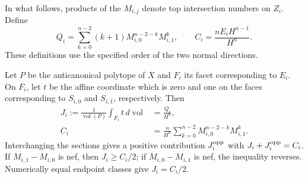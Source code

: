 In what follows, products of the $M_{i,j}$ denote top intersection
numbers on $Z_i$. Define
\begin{equation}\label{intrinsic:Q}
 Q_i=\sum_{k=0}^{n-2}(k+1)M_{i,0}^{n-2-k}M_{i,1}^k,
 \qquad C_i=\frac{nE_iH^{n-1}}{H^n}.
\end{equation}
These definitions use the specified order of the two normal directions.

\begin{proposition}\label{intrinsic:intersections}
Let $P$ be the anticanonical polytope of $X$ and $F_i$ its facet
corresponding to $E_i$. On $F_i$, let $t$ be the affine coordinate
which is zero and one on the faces corresponding to $S_{i,0}$ and
$S_{i,1}$, respectively. Then
\begin{align}
 J_i:=\frac{1}{\operatorname{vol}(P)}\int_{F_i}t\,d\operatorname{vol}
 &=\frac{Q_i}{H^n},\label{intrinsic:moment}\\
 C_i&=\frac{n}{H^n}\sum_{k=0}^{n-2}
              M_{i,0}^{n-2-k}M_{i,1}^k.\label{intrinsic:exceptional-degree}
\end{align}
Interchanging the sections gives a positive contribution $J_i^{\rm opp}$
with $J_i+J_i^{\rm opp}=C_i$. If $M_{i,1}-M_{i,0}$ is nef, then
$J_i\ge C_i/2$; if $M_{i,0}-M_{i,1}$ is nef, the inequality reverses.
Numerically equal endpoint classes give $J_i=C_i/2$.
\end{proposition}

